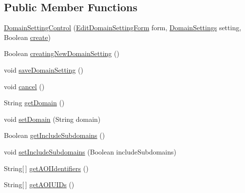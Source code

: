 \subsection*{Public Member Functions}
\begin{DoxyCompactItemize}
\item 
\hyperlink{class_web_analyzer_1_1_u_i_1_1_interaction_objects_1_1_domain_setting_control_a301b531dda08a3e63de11d1fed1b8742}{Domain\+Setting\+Control} (\hyperlink{class_web_analyzer_1_1_u_i_1_1_edit_domain_setting_form}{Edit\+Domain\+Setting\+Form} form, \hyperlink{class_web_analyzer_1_1_models_1_1_settings_model_1_1_domain_settings}{Domain\+Settings} setting, Boolean \hyperlink{_u_i_2_h_t_m_l_resources_2js_2lib_2underscore_8min_8js_a8bd5981157799459d39a59e8c4a0de04}{create})
\item 
Boolean \hyperlink{class_web_analyzer_1_1_u_i_1_1_interaction_objects_1_1_domain_setting_control_a8216956129f4fc43850bbb38d1287ad4}{creating\+New\+Domain\+Setting} ()
\item 
void \hyperlink{class_web_analyzer_1_1_u_i_1_1_interaction_objects_1_1_domain_setting_control_a0f5c683be120524708ad1dcd570ed4d5}{save\+Domain\+Setting} ()
\item 
void \hyperlink{class_web_analyzer_1_1_u_i_1_1_interaction_objects_1_1_domain_setting_control_a88a19e4077e5a695bb303d38401ffc7d}{cancel} ()
\item 
String \hyperlink{class_web_analyzer_1_1_u_i_1_1_interaction_objects_1_1_domain_setting_control_ad74139e31259a870a6937db206289f30}{get\+Domain} ()
\item 
void \hyperlink{class_web_analyzer_1_1_u_i_1_1_interaction_objects_1_1_domain_setting_control_a0c63b0dc50c545f4f1f0a35a2391b855}{set\+Domain} (String domain)
\item 
Boolean \hyperlink{class_web_analyzer_1_1_u_i_1_1_interaction_objects_1_1_domain_setting_control_ad83ffda676c2290766597c60b18d1518}{get\+Include\+Subdomains} ()
\item 
void \hyperlink{class_web_analyzer_1_1_u_i_1_1_interaction_objects_1_1_domain_setting_control_ac441d0f2d1d3b11027cea85d0c4a9e86}{set\+Include\+Subdomains} (Boolean include\+Subdomains)
\item 
String\mbox{[}$\,$\mbox{]} \hyperlink{class_web_analyzer_1_1_u_i_1_1_interaction_objects_1_1_domain_setting_control_ab0d5543794158ae46676a22a7a26c969}{get\+A\+O\+I\+Identifiers} ()
\item 
String\mbox{[}$\,$\mbox{]} \hyperlink{class_web_analyzer_1_1_u_i_1_1_interaction_objects_1_1_domain_setting_control_a8353bbc458740227e1ed2a3ab2eb0566}{get\+A\+O\+I\+U\+I\+Ds} ()

\end{DoxyCompactItemize}
